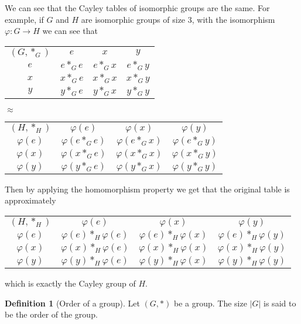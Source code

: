 \documentclass[11pt,a4paper]{article}
\theoremstyle{definition}
\newtheorem{definition}{Definition}[section]
\theoremstyle{plain}
\begin{document}
  We can see that the Cayley tables of isomorphic groups are the same.
  For example, if $G$ and $H$ are isomorphic groups of size $3$,
  with the isomorphism $\varphi \colon G \to H$ we can see that
  \begin{center}
    \begin{tabular}{c | c c c}
      $(G,*_G)$ & $e$ & $x$ & $y$ \\
      \cline{1-4}
      $e$ & $e *_G e$ & $e *_G x$ & $e *_G y$ \\
      $x$ & $x *_G e$ & $x *_G x$ & $x *_G y$ \\
      $y$ & $y *_G e$ & $y *_G x$ & $y *_G y$ 
    \end{tabular} $\approx$
    \begin{tabular}{c | c c c}
      $(H,*_H)$ & $\varphi(e)$ & $\varphi(x)$ & $\varphi(y)$ \\
      \cline{1-4}
      $\varphi(e)$ & $\varphi(e *_G e)$ & $\varphi(e *_G x)$ & $\varphi(e *_G y)$ \\
      $\varphi(x)$ & $\varphi(x *_G e)$ & $\varphi(x *_G x)$ & $\varphi(x *_G y)$ \\
      $\varphi(y)$ & $\varphi(y *_G e)$ & $\varphi(y *_G x)$ & $\varphi(y *_G y)$
    \end{tabular}
  \end{center}
  Then by applying the homomorphism property we get that the original
  table is approximately
  \begin{center} 
    \begin{tabular}{c | c c c}
      $(H,*_H)$ & $\varphi(e)$ & $\varphi(x)$ & $\varphi(y)$ \\
      \cline{1-4}
      $\varphi(e)$ & $\varphi(e) *_H \varphi(e)$ & $\varphi(e) *_H \varphi(x)$ & 
        $\varphi(e) *_H \varphi(y)$ \\
      $\varphi(x)$ & $\varphi(x) *_H \varphi(e)$ & $\varphi(x) *_H \varphi(x)$ &
        $\varphi(x) *_H \varphi(y)$ \\
      $\varphi(y)$ & $\varphi(y) *_H \varphi(e)$ & $\varphi(y) *_H \varphi(x)$ &
        $\varphi(y) *_H \varphi(y)$
    \end{tabular}
  \end{center}

  which is exactly the Cayley group of $H$.
  
  \begin{definition}[Order of a group]
    Let $(G, *)$ be a group. The size $|G|$ is said to be the order
    of the group.
  \end{definition}
\end{document}
